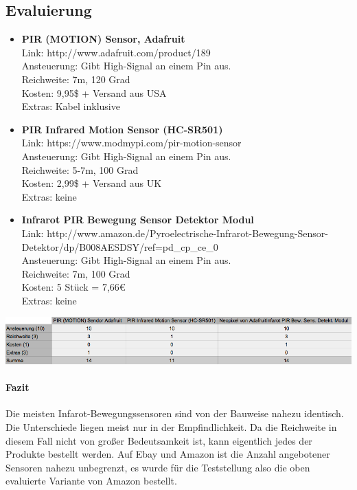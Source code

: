 \subsection{Evaluierung}
\begin{itemize}
\item \textbf{PIR (MOTION) Sensor, Adafruit}\\
Link: http://www.adafruit.com/product/189\\
Ansteuerung: Gibt High-Signal an einem Pin aus.\\
Reichweite: 7m, 120 Grad\\
Kosten: 9,95\$ + Versand aus USA\\
Extras: Kabel inklusive\\
\item \textbf{PIR Infrared Motion Sensor (HC-SR501)}\\
Link: https://www.modmypi.com/pir-motion-sensor\\
Ansteuerung: Gibt High-Signal an einem Pin aus.\\
Reichweite: 5-7m, 100 Grad\\
Kosten: 2,99\$ + Versand aus UK\\
Extras: keine\\
\item \textbf{Infrarot PIR Bewegung Sensor Detektor Modul}\\
Link: http://www.amazon.de/Pyroelectrische-Infrarot-Bewegung-Sensor-Detektor/dp/B008AESDSY/ref=pd\_cp\_ce\_0\\
Ansteuerung: Gibt High-Signal an einem Pin aus.\\
Reichweite: 7m, 100 Grad\\
Kosten: 5 Stück = 7,66€\\
Extras: keine\\
\end{itemize}
\begin{minipage}{\linewidth}
            \centering
            \includegraphics[width=\textwidth]{./data/evaluierung-ms.png}
        \end{minipage}
\paragraph{Fazit}
Die meisten Infarot-Bewegungssensoren sind von der Bauweise nahezu identisch. Die Unterschiede liegen meist nur in der Empfindlichkeit. Da die Reichweite in diesem Fall nicht von großer Bedeutsamkeit ist, kann eigentlich jedes der Produkte bestellt werden. Auf Ebay und Amazon ist die Anzahl angebotener Sensoren nahezu unbegrenzt, es wurde für die Teststellung also die oben evaluierte Variante von Amazon bestellt. 
